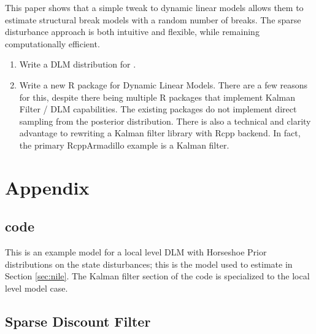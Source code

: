 \documentclass{article}
\begin{document}
This paper shows that a simple tweak to dynamic linear models allows them to estimate structural break models with a random number of breaks.
The sparse disturbance approach is both intuitive and flexible, while remaining computationally efficient.

\begin{enumerate}
\item Write a DLM distribution for \Stan{}.
\item Write a new R package for Dynamic Linear Models. There are a few reasons for this, despite there being multiple R packages that implement Kalman Filter / DLM capabilities. 
The existing packages do not implement direct sampling from the posterior distribution. 
There is also a technical and clarity advantage to rewriting a Kalman filter library with Rcpp backend. In fact, the primary RcppArmadillo example is 
a Kalman filter.
\end{enumerate}

\clearpage{}

\printbibliography{}

\section{Appendix}
\label{sec:appendix
}
\subsection{code}
\label{sec:code}

This is an example \Stan{} model for a local level DLM with Horseshoe Prior distributions on the state disturbances; this is the \Stan{} model used to estimate  in Section \ref{sec:nile}. 
The Kalman filter section of the \Stan{} code is specialized to the local level model case.

\begin{singlespace}
    
\end{singlespace}

\subsection{Sparse Discount Filter}
\label{sec:sparse-disc-filt}
\end{document}
